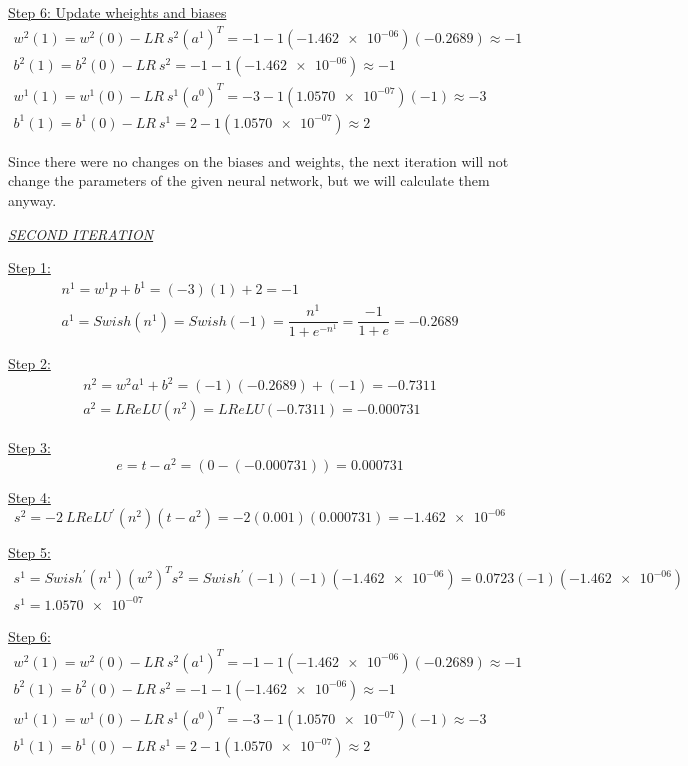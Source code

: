 \underline{Step 6: Update wheights and biases}
\[
\begin{gathered}
	w^{2}(1)=w^{2}(0)-LR\ s^{2}(a^{1})^{T} = -1 - 1(\num{-1.462e-06})(-0.2689) \approx -1 \\
	 b^{2}(1)=b^{2}(0)-LR\ s^{2} = -1 - 1(\num{-1.462e-06}) \approx -1 \\
	 w^{1}(1)=w^{1}(0)-LR\ s^{1}(a^{0})^{T} = -3 - 1(\num{1.0570e-07})(-1) \approx -3 \\
	 b^{1}(1)=b^{1}(0)-LR\ s^{1} = 2 - 1(\num{1.0570e-07}) \approx 2
\end{gathered}
\]

Since there were no changes on the biases and weights, the next iteration will not change the parameters of the given neural network, but we will calculate them anyway.
\vspace*{1mm}
\begin{center}
	\underline{\textit{SECOND ITERATION}}
\end{center}

\underline{Step 1:}
\[
\begin{gathered}
	n^1 = w^1 p + b^1 = (-3)(1) + 2 = -1\\
	a^1 = {Swish}\left(n^1\right) = {Swish}\left(-1\right) = \dfrac{n^1}{1+e^{-n^1}} = \dfrac{-1}{1+e} = -0.2689
\end{gathered}
\]

\underline{Step 2:}
\[
\begin{gathered}
	n^2 = w^2 a^1 + b^2 = (-1)(-0.2689) + (-1) = -0.7311 \\ 
	a^2 = {LReLU}\left(n^2\right) = {LReLU}\left(-0.7311\right) = -0.000731
\end{gathered}
\]

\underline{Step 3:}
\[
e = t-a^2 = \left(0-\left(-0.000731\right)\right) = 0.000731
\]

\underline{Step 4:}
\[
s^2 = -2\ {LReLU}^{'}\left(n^2\right)\left(t-a^2\right) = -2 \left(0.001\right) \left(0.000731\right) = \num{-1.462e-06}
\]

\underline{Step 5:}
\[
\begin{gathered}
	s^1 = Swish^{'} \left(n^1\right) \left(w^2\right)^T s^2 = Swish^{'} \left(-1\right) \left(-1\right) (\num{-1.462e-06}) = 0.0723 (-1) (\num{-1.462e-06}) \\
	s^1 = \num{1.0570e-07}
\end{gathered}
\]

\underline{Step 6:}
\[
\begin{gathered}
	w^{2}(1)=w^{2}(0)-LR\ s^{2}(a^{1})^{T} = -1 - 1(\num{-1.462e-06})(-0.2689) \approx -1 \\
	b^{2}(1)=b^{2}(0)-LR\ s^{2} = -1 - 1(\num{-1.462e-06}) \approx -1 \\
	w^{1}(1)=w^{1}(0)-LR\ s^{1}(a^{0})^{T} = -3 - 1(\num{1.0570e-07})(-1) \approx -3 \\
	b^{1}(1)=b^{1}(0)-LR\ s^{1} = 2 - 1(\num{1.0570e-07}) \approx 2
\end{gathered}
\]